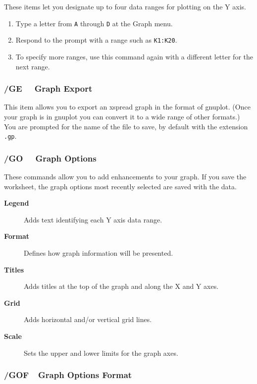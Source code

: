 \documentclass[titlepage]{article}
\begin{document}
These items let you designate up to four data ranges for plotting on
the Y axis.

\usage{}
\begin{enumerate}\itemsep -2pt
\item Type a letter from \texttt{A} through \texttt{D} at the Graph menu.
\item Respond to the prompt with a range such as \texttt{K1:K20}.
\item To specify more ranges, use this command again with a different
    letter for the next range.
\end{enumerate}

\subsubsection{/GE \ \  Graph Export}

This item allows you to export an \textsf{xspread} graph in the format
of \textsf{gnuplot}.  (Once your graph is in \textsf{gnuplot} you can
convert it to a wide range of other formats.)  You are prompted for
the name of the file to save, by default with the extension \texttt{.gp}.

\subsubsection{/GO \ \     Graph Options}

These commands allow you to add enhancements to your graph.  If you
save the worksheet, the graph options most recently selected are saved
with the data.

\begin{description}
\item[{\bf Legend }]{Adds text identifying each Y axis data range.}
\item[{\bf Format }]{Defines how graph information will be presented.}
\item[{\bf Titles }]{Adds titles at the top of the graph and along the
    X and Y axes.}
\item[{\bf Grid}]{ Adds horizontal and/or vertical grid lines.}
\item[{\bf Scale }]{Sets the upper and lower limits for the graph axes.}

\end{description}
        
\subsubsection{/GOF\ \     Graph Options Format}
\end{document}
